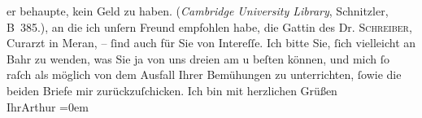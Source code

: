 \begin{ledgroupsized}[t]{13cm}
{{{                  er behaupte, kein Geld zu haben. (\emph{Cambridge University Library}, Schnitzler, B 385.)}}}\label{K_L00199-2h}, an die ich unſern Freund empfohlen habe, die Gattin des Dr.
                  \textsc{Schreiber}, Curarzt in Meran, – ſind auch für Sie
               von Intereſſe. Ich bitte Sie, ſich vielleicht an Bahr zu wenden, was Sie ja von uns dreien am \label{K_L00199-3v}\label{K_L00199-3h}
               u beſten können, {\pb}und mich ſo raſch als möglich von dem
               Ausfall Ihrer Bemühungen zu unterrichten, ſowie die beiden Briefe mir
               zurückzuſchicken.\pend
           \pstart
           Ich bin mit herzlichen Grüßen{\\[\baselineskip]}Ihr\spacefill\mbox{Arthur}\pend
           \leftskip=0em{}
         
         \endnumbering{}\end{ledgroupsized}  \newcommand{\dateiname}{L00199}\newcommand{\titel}{Arthur Schnitzler an Hugo von Hofmannsthal, [21. 4. 1893?]}\newcommand{\editorInnen}{ Martin Anton Müller und Gerd-Hermann Susen}
      